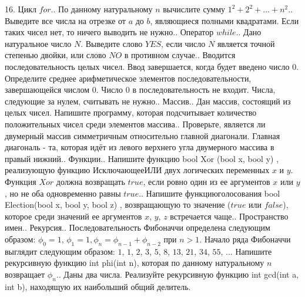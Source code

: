 \documentclass[a4paper,12pt]{article}
\begin{document}
16. Цикл $for$.. По данному натуральному $n$ вычислите сумму $1^2+2^2+\dots+n^2$.. Выведите все числа на отрезке от $a$ до $b$, являющиеся полными квадратами. Если таких чисел нет, то ничего выводить не нужно.. Оператор $while$.. Дано натуральное число $N$. Выведите слово $YES$, если число $N$ является точной степенью двойки, или слово $NO$ в противном случае.. Вводится последовательность целых чисел. Ввод завершается, когда будет введено число $0$. Определите среднее арифметическое элементов последовательности, завершающейся числом $0$. Число $0$ в последовательность не входит. Числа, следующие за нулем, считывать не нужно.. Массив.. Дан массив, состоящий из целых чисел. Напишите программу, которая подсчитывает количество положительных чисел среди элементов массива.. Проверьте, является ли двумерный массив симметричным относительно главной диагонали. Главная диагональ - та, которая идёт из левого верхнего угла двумерного массива в правый нижний.. Функции.. Напишите функцию\newline
bool Xor (bool x, bool y) {}, реализующую функцию $Исключающее ИЛИ$ двух логических переменных $x$ и $y$. Функция $Xor$ должна возвращать $true$, если ровно один из ее аргументов $x$ или $y$, но не оба одновременно равны $true$.. Напишите $функцию голосования$\newline
bool Election(bool x, bool y, bool z) {}, возвращающую то значение ($true$ или $false$), которое среди значений ее аргументов $x$, $y$, $z$ встречается чаще.. Пространство имен.. Рекурсия.. Последовательность Фибоначчи определена следующим образом: $\phi_0=1$, $\phi_1=1, \phi_n=\phi_{n-1}+\phi_{n-2}$ при $n>1$. Начало ряда Фибоначчи выглядит следующим образом: $1$, $1$, $2$, $3$, $5$, $8$, $13$, $21$, $34$, $55$, $\dots$ Напишите рекурсивную функцию\newline
int phi(int n), которая по данному натуральному $n$ возвращает $\phi_n$.. Даны два числа. Реализуйте рекурсивную функцию\newline
int gcd(int a, int b), находящую их наибольший общий делитель.\newline
\end{document}

